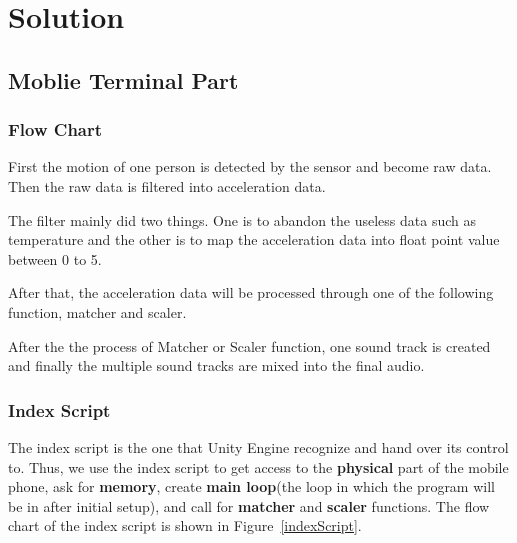 \section{Solution}

\subsection{Moblie Terminal Part}

\subsubsection{Flow Chart}

\hspace*{2em}First the motion of one person is detected by the sensor and become
raw data. 
   Then the raw data is filtered into acceleration data. 

   The filter mainly did two things.
   One is to abandon the useless data such as temperature and the other is to
   map the acceleration data into float point value between 0 to 5. 

   After that, the acceleration data will be processed through one of the
   following function, matcher and scaler. 

   After the the process of Matcher or Scaler function, one sound track is created and finally the multiple
   sound tracks are mixed into the final audio. 

\subsubsection{Index Script}

The index script is the one that Unity Engine recognize and hand over its
control to. 
Thus, we use the index script to get access to the \textbf{physical} part of the
mobile phone, ask for \textbf{memory}, create \textbf{main loop}(the loop in which the program will be in after initial setup), and call for
\textbf{matcher} and \textbf{scaler} functions.
The flow chart of the index script is shown in Figure~\ref{indexScript}.


